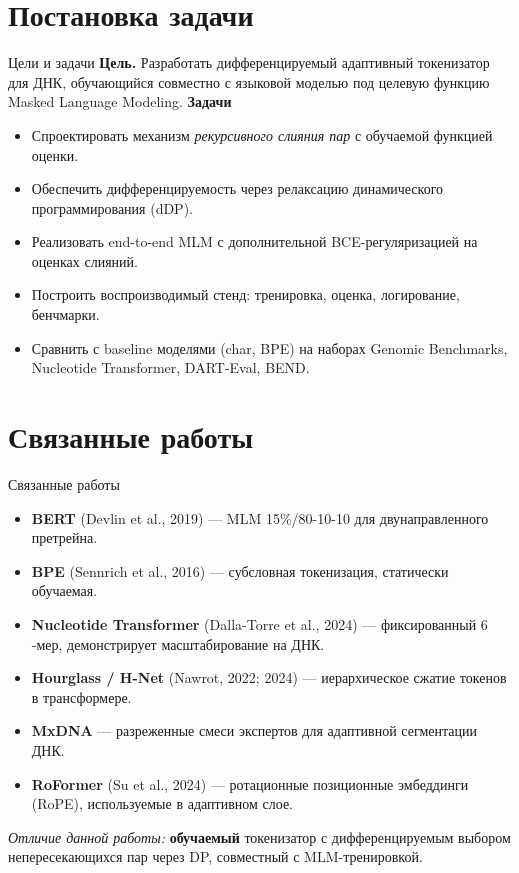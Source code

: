 \documentclass[aspectratio=169,xcolor=table]{beamer}
\begin{document}
\section{Постановка задачи}

\begin{frame}{Цели и задачи}
  \textbf{Цель.} Разработать дифференцируемый адаптивный токенизатор для
  ДНК, обучающийся совместно с языковой моделью под целевую функцию
  Masked Language Modeling.
  \medskip
  \textbf{Задачи}
  \begin{itemize}
    \item Спроектировать механизм \emph{рекурсивного слияния пар} с
          обучаемой функцией оценки.
    \item Обеспечить дифференцируемость через релаксацию динамического
          программирования (dDP).
    \item Реализовать end-to-end MLM с дополнительной BCE-регуляризацией
          на оценках слияний.
    \item Построить воспроизводимый стенд: тренировка, оценка,
          логирование, бенчмарки.
    \item Сравнить с baseline моделями (char, BPE) на наборах
          Genomic Benchmarks, Nucleotide Transformer, DART-Eval, BEND.
  \end{itemize}
\end{frame}

\section{Связанные работы}

\begin{frame}{Связанные работы}
  \begin{itemize}
    \item \textbf{BERT} (Devlin et al., 2019) --- MLM 15\%/80-10-10 для
          двунаправленного претрейна.
    \item \textbf{BPE} (Sennrich et al., 2016) --- субсловная
          токенизация, статически обучаемая.
    \item \textbf{Nucleotide Transformer} (Dalla-Torre et al., 2024) ---
          фиксированный $6$-мер, демонстрирует масштабирование на ДНК.
    \item \textbf{Hourglass / H-Net} (Nawrot, 2022; 2024) ---
          иерархическое сжатие токенов в трансформере.
    \item \textbf{MxDNA} --- разреженные смеси экспертов для адаптивной
          сегментации ДНК.
    \item \textbf{RoFormer} (Su et al., 2024) --- ротационные позиционные
          эмбеддинги (RoPE), используемые в адаптивном слое.
  \end{itemize}
  \medskip
  \emph{Отличие данной работы:} \textbf{обучаемый} токенизатор с
  дифференцируемым выбором непересекающихся пар через DP,
  совместный с MLM-тренировкой.
\end{frame}
\end{document}
